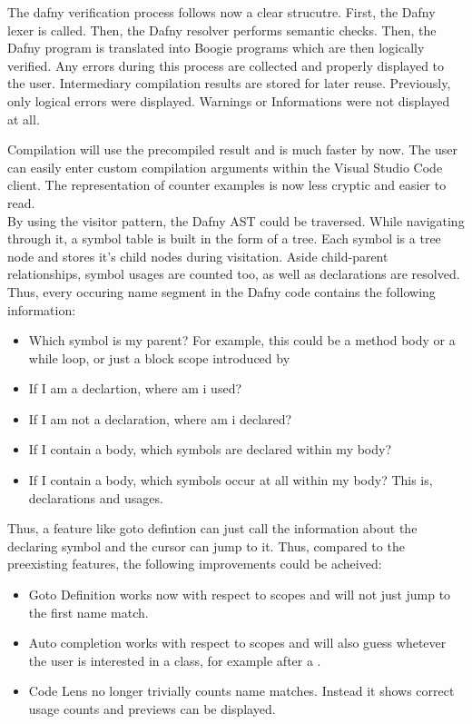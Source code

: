 The dafny verification process follows now a clear strucutre. First, the Dafny lexer is called. Then, the Dafny resolver performs semantic checks. Then, the Dafny program is translated into Boogie programs which are then logically verified. Any errors during this process are collected and properly displayed to the user. Intermediary compilation results are stored for later reuse. Previously, only logical errors were displayed. Warnings or Informations were not displayed at all.

Compilation will use the precompiled result and is much faster by now. The user can easily enter custom compilation arguments within the Visual Studio Code client. The representation of counter examples is now less cryptic and easier to read.\\

By using the visitor pattern, the Dafny AST could be traversed. While navigating through it, a symbol table is built in the form of a tree. Each symbol is a tree node and stores it's child nodes during visitation. Aside child-parent relationships, symbol usages are counted too, as well as declarations are resolved. Thus, every occuring name segment in the Dafny code contains the following information:
\begin{itemize}
    \item Which symbol is my parent? For example, this could be a method body or a while loop, or just a block scope introduced by \code{\string{$\ddots$\string}}
    \item If I am a declartion, where am i used?
    \item If I am not a declaration, where am i declared?
    \item If I contain a body, which symbols are declared within my body?
    \item If I contain a body, which symbols occur at all within my body? This is, declarations and usages.
\end{itemize}
Thus, a feature like goto defintion can just call the information about the declaring symbol and the cursor can jump to it. Thus, compared to the preexisting features, the following improvements could be acheived:
\begin{itemize}
    \item Goto Definition works now with respect to scopes and will not just jump to the first name match.
    \item Auto completion works with respect to scopes and will also guess whetever the user is interested in a class, for example after a .
    \item Code Lens no longer trivially counts name matches. Instead it shows correct usage counts and previews can be displayed.
\end{itemize}



